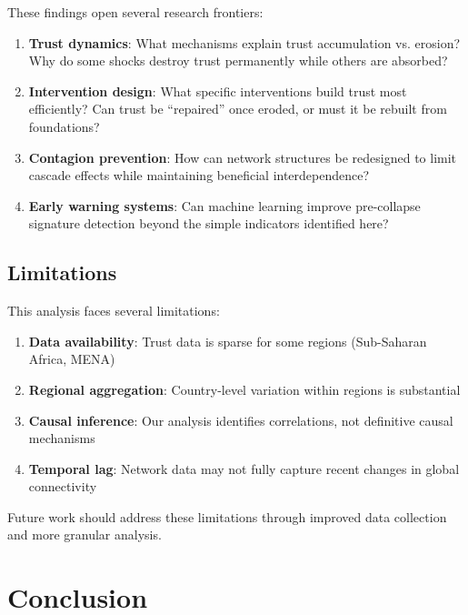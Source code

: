 \documentclass[12pt,a4paper]{article}
\begin{document}
These findings open several research frontiers:

\begin{enumerate}
    \item \textbf{Trust dynamics}: What mechanisms explain trust accumulation vs. erosion? Why do some shocks destroy trust permanently while others are absorbed?

    \item \textbf{Intervention design}: What specific interventions build trust most efficiently? Can trust be ``repaired'' once eroded, or must it be rebuilt from foundations?

    \item \textbf{Contagion prevention}: How can network structures be redesigned to limit cascade effects while maintaining beneficial interdependence?

    \item \textbf{Early warning systems}: Can machine learning improve pre-collapse signature detection beyond the simple indicators identified here?
\end{enumerate}

\subsection{Limitations}

This analysis faces several limitations:

\begin{enumerate}
    \item \textbf{Data availability}: Trust data is sparse for some regions (Sub-Saharan Africa, MENA)
    \item \textbf{Regional aggregation}: Country-level variation within regions is substantial
    \item \textbf{Causal inference}: Our analysis identifies correlations, not definitive causal mechanisms
    \item \textbf{Temporal lag}: Network data may not fully capture recent changes in global connectivity
\end{enumerate}

Future work should address these limitations through improved data collection and more granular analysis.

\section{Conclusion}
\label{sec:conclusion}
\end{document}
